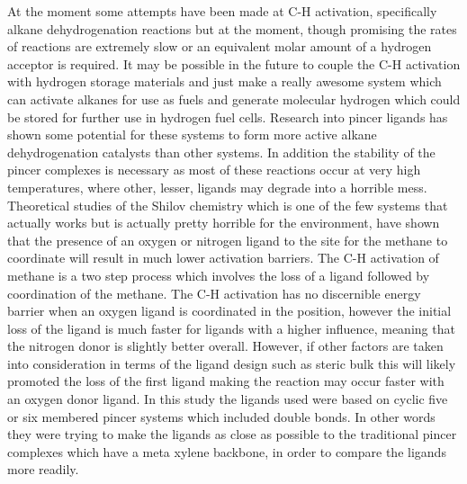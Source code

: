 At the moment some attempts have been made at C-H activation, specifically alkane dehydrogenation reactions but at the moment, though promising the rates of reactions are extremely slow or an equivalent molar amount of a hydrogen acceptor is required.  It may be possible in the future to couple the C-H activation with hydrogen storage materials and just make a really awesome system which can activate alkanes for use as fuels and generate molecular hydrogen which could be stored for further use in hydrogen fuel cells.  Research into pincer ligands has shown some potential for these systems to form more active alkane dehydrogenation catalysts than other systems.  In addition the stability of the pincer complexes is necessary as most of these reactions occur at very high temperatures, where other, lesser, ligands may degrade into a horrible mess.  Theoretical studies of the Shilov chemistry which is one of the few systems that actually works but is actually pretty horrible for the environment, have shown that the presence of an oxygen or nitrogen ligand \trans{} to the site for the methane to coordinate will result in much lower activation barriers.  The C-H activation of methane is a two step process which involves the loss of a ligand followed by coordination of the methane.  The C-H activation has no discernible energy barrier when an oxygen ligand is coordinated in the \trans{} position, however the initial loss of the ligand is much faster for ligands with a higher \trans{} influence, meaning that the nitrogen donor is slightly better overall.  However, if other factors are taken into consideration in terms of the ligand design such as steric bulk this will likely promoted the loss of the first ligand making the reaction may occur faster with an oxygen donor ligand.  In this study the ligands used were based on cyclic five or six membered pincer systems which included double bonds.  In other words they were trying to make the ligands as close as possible to the traditional pincer complexes which have a meta xylene backbone, in order to compare the ligands more readily.

